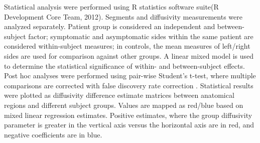 Statistical analysis were performed using R statistics software suite(R Development Core Team, 2012). Segments and diffusivity measurements were analyzed separately. Patient group is considered an independent and between-subject factor; symptomatic and asymptomatic sides within the same patient are considered within-subject measures; in controls, the mean measures of left/right sides are used for comparison against other groups. A linear mixed model \cite{Pinheiro2011} is used to determine the statistical significance of within- and between-subject effects. Post hoc analyses were performed using pair-wise Student’s t-test, where multiple comparisons are corrected with false discovery rate correction \cite{Hothorn2008}. Statistical results were plotted \cite{Hunter2007} as diffusivity difference estimate matrices between anatomical regions and different subject groups. Values are mapped as red/blue based on mixed linear regression estimates. Positive estimates, where the group diffusivity parameter is greater in the vertical axis versus the horizontal axis are in red, and negative coefficients are in blue. 


